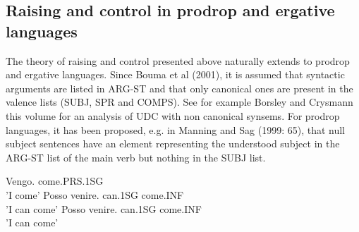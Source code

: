 \documentclass[output=paper
	        ,collection
	        ,collectionchapter
 	        ,biblatex
                ,babelshorthands
                ,newtxmath
                ,draftmode
                ,colorlinks, citecolor=brown
]{langscibook}
\begin{document}



\subsection{Raising and control in prodrop and ergative languages}
The theory of raising and control presented above naturally extends to prodrop and ergative languages. 
Since Bouma et al (2001), it is assumed that syntactic arguments are listed in ARG-ST and that only canonical ones are present in the valence lists (SUBJ, SPR and COMPS). See for example Borsley and Crysmann this volume for an analysis of UDC with non canonical synsems. For prodrop languages, it has been proposed, e.g. in Manning and Sag (1999: 65),  that null subject sentences have an element representing the understood subject in the ARG-ST list of the main verb but nothing in the SUBJ list. 

\eal
\ex Vengo. \label{Italian}
come.PRS.1SG\\
'I come'
\ex Posso venire. \label{Italian-raising}
can.1SG come.INF\\
'I can come'
\ex Posso venire. \label{Italian-control}
can.1SG come.INF\\
'I can come'
\zl
\end{document}
